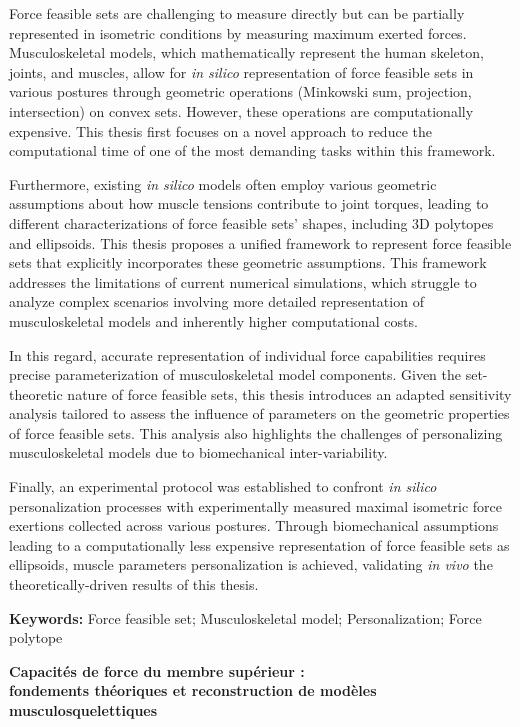 Force feasible sets are challenging to measure directly but can be partially represented in isometric conditions by measuring maximum exerted forces. Musculoskeletal models, which mathematically represent the human skeleton, joints, and muscles, allow for \emph{in silico} representation of force feasible sets in various postures through geometric operations (Minkowski sum, projection, intersection) on convex sets. However, these operations are computationally expensive. This thesis first focuses on a novel approach to reduce the computational time of one of the most demanding tasks within this framework.

Furthermore, existing \emph{in silico} models often employ various geometric assumptions about how muscle tensions contribute to joint torques, leading to different characterizations of force feasible sets' shapes, including 3D polytopes and ellipsoids. This thesis proposes a unified framework to represent force feasible sets that explicitly incorporates these geometric assumptions. This framework addresses the limitations of current numerical simulations, which struggle to analyze complex scenarios involving more detailed representation of musculoskeletal models and inherently higher computational costs.

In this regard, accurate representation of individual force capabilities requires precise parameterization of musculoskeletal model components. Given the set-theoretic nature of force feasible sets, this thesis introduces an adapted sensitivity analysis tailored to assess the influence of parameters on the geometric properties of force feasible sets. This analysis also highlights the challenges of personalizing musculoskeletal models due to biomechanical inter-variability.

Finally, an experimental protocol was established to confront \emph{in silico} personalization processes with experimentally measured maximal isometric force exertions collected across various postures. Through biomechanical assumptions leading to a computationally less expensive representation of force feasible sets as ellipsoids, muscle parameters personalization is achieved, validating \emph{in vivo} the theoretically-driven results of this thesis.

\textbf{Keywords:} Force feasible set; Musculoskeletal model; Personalization; Force polytope

\clearpage
\begin{center}
    \textbf{Capacités de force du membre supérieur :}\\
    \textbf{fondements théoriques et reconstruction de modèles musculosquelettiques}
\end{center}

